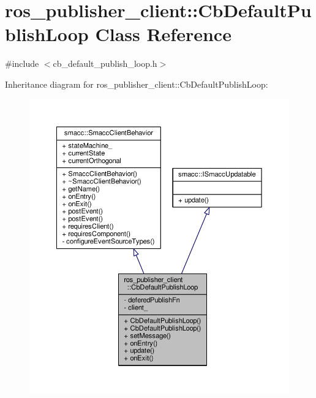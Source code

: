 \hypertarget{classros__publisher__client_1_1CbDefaultPublishLoop}{}\section{ros\+\_\+publisher\+\_\+client\+:\+:Cb\+Default\+Publish\+Loop Class Reference}
\label{classros__publisher__client_1_1CbDefaultPublishLoop}


{\ttfamily \#include $<$cb\+\_\+default\+\_\+publish\+\_\+loop.\+h$>$}



Inheritance diagram for ros\+\_\+publisher\+\_\+client\+:\+:Cb\+Default\+Publish\+Loop\+:\nopagebreak
\begin{figure}[H]
\begin{center}
\leavevmode
\includegraphics[width=350pt]{classros__publisher__client_1_1CbDefaultPublishLoop__inherit__graph}
\end{center}
\end{figure}


